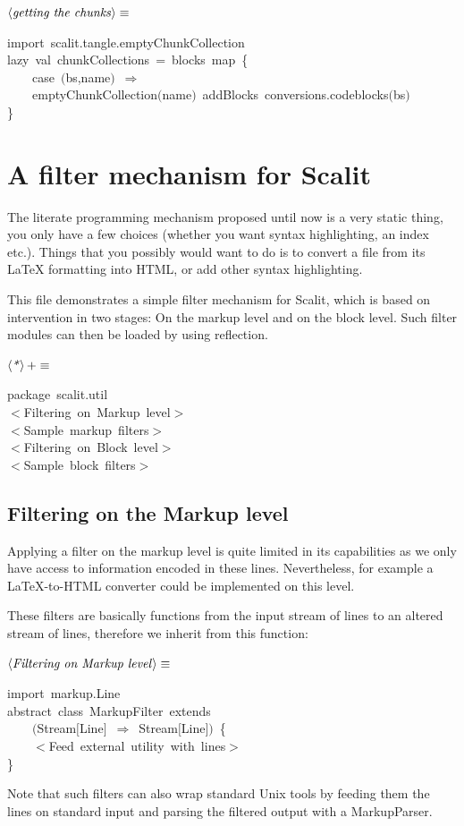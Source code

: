 \documentclass[a4paper,12pt]{article}
\begin{document}
$\left<\mbox{\emph{getting the chunks}}\right>\equiv$
\begin{program}{\vem import}~scalit.tangle.emptyChunkCollection
\\{\vem lazy}~{\vem val}~chunkCollections~=~blocks~map~{\small\{}
\\~~~~{\vem case}~$($bs,name$)$~$\Rightarrow$
\\~~~~emptyChunkCollection$($name$)$~addBlocks~conversions.codeblocks$($bs$)$
\\{\small\}}
\end{program}
\section{A filter mechanism for Scalit}
The literate programming mechanism proposed until now is a very static thing,
you only have a few choices (whether you want syntax highlighting, an index
etc.). Things that you possibly would want to do is to convert a file from
its LaTeX formatting into HTML, or add other syntax highlighting.

This file demonstrates a simple filter mechanism for Scalit, which is
based on intervention in two stages: On the markup level and on the
block level. Such filter modules can then be loaded by using reflection.

$\left<\mbox{\emph{*}}\right>+\equiv$
\begin{program}{\vem package}~scalit.util
\\[0.5em]$<$Filtering~on~Markup~level$>$
\\[0.5em]$<$Sample~markup~filters$>$
\\[0.5em]$<$Filtering~on~Block~level$>$
\\[0.5em]$<$Sample~block~filters$>$
\\[0.5em]\end{program}
\subsection{Filtering on the Markup level}
Applying a filter on the markup level is quite limited in its capabilities
as we only have access to information encoded in these lines. Nevertheless,
for example a LaTeX-to-HTML converter could be implemented on this level.

These filters are basically functions from the input stream of lines to
an altered stream of lines, therefore we inherit from this function:

$\left<\mbox{\emph{Filtering on Markup level}}\right>\equiv$
\begin{program}{\vem import}~markup.Line
\\{\vem abstract}~{\vem class}~MarkupFilter~{\vem extends}
\\~~~~$($Stream$[$Line$]$~$\Rightarrow$~Stream$[$Line$]$$)$~{\small\{}
\\~~~~$<$Feed~external~utility~{\vem with}~lines$>$
\\{\small\}}
\\[0.5em]\end{program}
Note that such filters can also wrap standard Unix tools by feeding them
the lines on standard input and parsing the filtered output with a MarkupParser.
\end{document}
